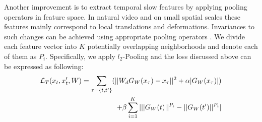 Another improvement is to extract temporal slow features by applying pooling operators in feature space. 
In natural video and on small spatial scales these features mainly correspond to local translations and deformations. 
Invariances to such changes can be achieved using appropriate pooling operators \cite{Mallat2013scattering}.
We divide each feature vector into $K$ potentially overlapping neighborhoods and denote each of them as $P_i$. 
Specifically, we apply $l_2$-Pooling and the loss discussed above can be expressed as following:
\begin{equation}
\begin{split}
\lagr_T(x_t, x_t\rq{}, W) = \sum_{\tau = \{t, t\rq{}\}} (||W_d G_W(x_\tau) - x_\tau||^2 + \alpha |G_W(x_\tau)|) \\
+ \beta \sum_{i=1}^K |||G_W(t)||^{P_i} -  ||G_W(t\rq{})||^{P_i}|
\end{split}
\end{equation}
